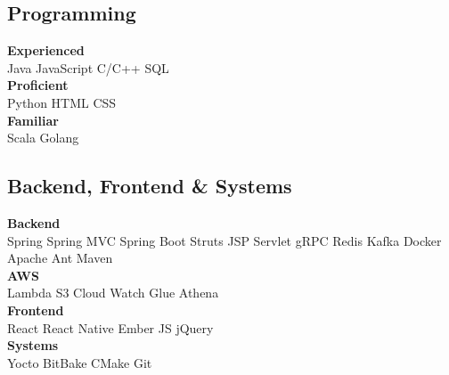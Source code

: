 \documentclass[11pt]{plushcv}
\begin{document}
\begin{minipage}[t]{0.45\textwidth}
\subsection{Programming}
\fontsize{11pt}{13pt}\selectfont %
\textbf{Experienced}\\ Java \textbullet{} JavaScript \textbullet{} C/C++ \textbullet{} SQL \\ \textbf{Proficient}\\ Python \textbullet{} HTML \textbullet{} CSS \\
\textbf{Familiar}\\ Scala \textbullet{} Golang
\end{minipage}
\hfill
\begin{minipage}[t]{0.52\textwidth}
\subsection{Backend, Frontend \& Systems}
\fontsize{11pt}{13pt}\selectfont %
\textbf{Backend}\\ Spring \textbullet{} Spring MVC \textbullet{} Spring Boot \textbullet{} Struts \textbullet{} JSP \textbullet{} Servlet \textbullet{} gRPC  \textbullet{} Redis \textbullet{} Kafka \textbullet{} Docker \textbullet{} Apache Ant \textbullet{} Maven \\
\textbf{AWS}\\ Lambda \textbullet{} S3 \textbullet{} Cloud Watch \textbullet{} Glue \textbullet{} Athena \\
\textbf{Frontend}\\ React \textbullet{} React Native \textbullet{} Ember JS \textbullet{} jQuery \\
\textbf{Systems}\\ Yocto \textbullet{} BitBake \textbullet{} CMake \textbullet{} Git
\end{minipage}

\vspace{25pt} %

\end{document}
